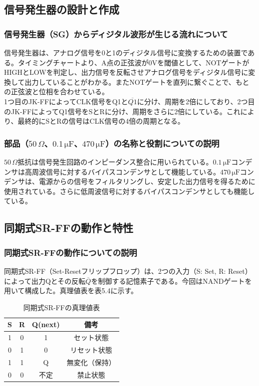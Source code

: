 \documentclass{jlreq}
\numberwithin{equation}{section}
\begin{document}
\subsection{信号発生器の設計と作成}
\subsubsection{信号発生器（SG）からディジタル波形が生じる流れについて}
信号発生器は、アナログ信号を0と1のディジタル信号に変換するための装置である。タイミングチャートより、A点の正弦波が0Vを閾値として、NOTゲートがHIGHとLOWを判定し、出力信号を反転させアナログ信号をディジタル信号に変換して出力していることがわかる。またNOTゲートを直列に繋ぐことで、もとの正弦波と位相を合わせている。\\
1つ目のJK-FFによってCLK信号をQ1と\(\overline{Q1}\)に分け、周期を2倍にしており、2つ目のJK-FFによってQ1信号をSとRに分け、周期をさらに2倍にしている。これにより、最終的にSとRの信号はCLK信号の4倍の周期となる。

\subsubsection{部品（$50\,\Omega$、$0.1\,\mathrm{\mu F}$、$470\,\mathrm{\mu F}$）の名称と役割についての説明}
$50\,\Omega$抵抗は信号発生回路のインピーダンス整合に用いられている。$0.1\,\mathrm{\mu F}$コンデンサは高周波信号に対するバイパスコンデンサとして機能している。$470\,\mathrm{\mu F}$コンデンサは、電源からの信号をフィルタリングし、安定した出力信号を得るために使用されている。さらに低周波信号に対するバイパスコンデンサとしても機能している。

\subsection{同期式SR-FFの動作と特性}
\subsubsection{同期式SR-FFの動作についての説明}
同期式SR-FF（Set-Resetフリップフロップ）は、2つの入力（S: Set, R: Reset）によって出力Qとその反転$\overline{Q}$を制御する記憶素子である。今回はNANDゲートを用いて構成した。真理値表を表5.4に示す。

\begin{table}[H]
  \centering
  \caption{同期式SR-FFの真理値表}
  \begin{tabular}{|c|c|c|c|}
    \hline
    S & R & Q(next) & 備考 \\ \hline
    1 & 0 & 1 & セット状態 \\ \hline
    0 & 1 & 0 & リセット状態 \\ \hline
    1 & 1 & Q & 無変化（保持） \\ \hline
    0 & 0 & 不定 & 禁止状態 \\ \hline
  \end{tabular}
\end{table}
\end{document}
